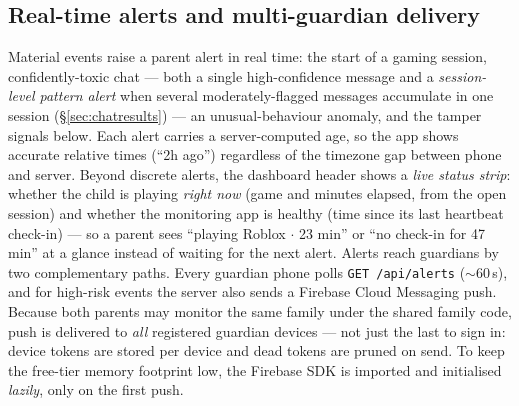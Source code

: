 \documentclass[11pt,a4paper]{article}
\begin{document}
\subsection{Real-time alerts and multi-guardian delivery}
Material events raise a parent alert in real time: the start of a gaming session,
confidently-toxic chat --- both a single high-confidence message and a
\emph{session-level pattern alert} when several moderately-flagged messages
accumulate in one session (\S\ref{sec:chatresults}) --- an unusual-behaviour anomaly,
and the tamper signals below.
Each alert carries a server-computed age, so the app shows accurate relative times
(``2h ago'') regardless of the timezone gap between phone and server. Beyond discrete
alerts, the dashboard header shows a \emph{live status strip}: whether the child is
playing \emph{right now} (game and minutes elapsed, from the open session) and whether
the monitoring app is healthy (time since its last heartbeat check-in) --- so a parent
sees ``playing Roblox $\cdot$ 23 min'' or ``no check-in for 47 min'' at a glance instead
of waiting for the next alert.
Alerts reach guardians by two complementary paths. Every guardian phone polls
\texttt{GET /api/alerts} ($\sim$60\,s), and for high-risk events the server also sends a
Firebase Cloud Messaging push. Because both parents may monitor the same family under the
shared family code, push is delivered to \emph{all} registered guardian devices --- not
just the last to sign in: device tokens are stored per device and dead tokens are pruned
on send. To keep the free-tier memory footprint low, the Firebase SDK is imported and
initialised \emph{lazily}, only on the first push.
\end{document}
